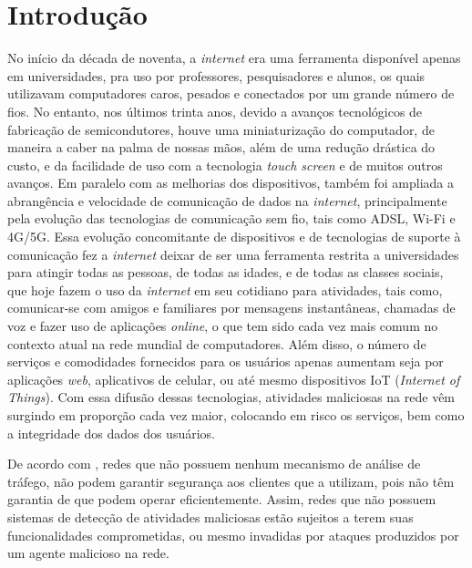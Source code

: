 \chapter[Introdução]{Introdução}
\label{introducao}

No início da década de noventa, a \textit{internet} era uma ferramenta disponível apenas em universidades, pra uso por professores, pesquisadores e alunos, os quais utilizavam computadores caros, pesados e conectados por um grande número de fios. No entanto, nos últimos trinta anos, devido a avanços tecnológicos de fabricação de semicondutores, houve uma miniaturização do computador, de maneira a caber na palma de nossas mãos, além de uma redução drástica do custo, e da facilidade de uso com a tecnologia \textit{touch screen} e de muitos outros avanços. Em paralelo com as melhorias dos dispositivos, também foi ampliada a abrangência e velocidade de comunicação de dados na \textit{internet}, principalmente pela evolução das tecnologias de comunicação sem fio, tais como ADSL, Wi-Fi e 4G/5G. Essa evolução concomitante de dispositivos e de tecnologias de suporte à comunicação fez a \textit{internet} deixar de ser uma ferramenta restrita a universidades para atingir todas as pessoas, de todas as idades, e de todas as classes sociais, que hoje fazem o uso da \textit{internet} em seu cotidiano para atividades, tais como, comunicar-se com amigos e familiares por mensagens instantâneas, chamadas de voz e fazer uso de aplicações \textit{online}, o que tem sido cada vez mais comum no contexto atual na rede mundial de computadores. Além disso, o número de serviços e comodidades fornecidos para os usuários apenas aumentam seja por aplicações \textit{web}, aplicativos de celular, ou até mesmo dispositivos IoT (\textit{Internet of Things}). Com essa difusão dessas tecnologias, atividades maliciosas na rede vêm surgindo em proporção cada vez maior, colocando em risco os serviços, bem como a integridade dos dados dos usuários. 

De acordo com , redes que não possuem nenhum mecanismo de análise de tráfego, não podem garantir segurança aos clientes que a utilizam, pois não têm garantia de que podem operar eficientemente. Assim, redes que não possuem sistemas de detecção de atividades maliciosas estão sujeitos a terem suas funcionalidades comprometidas, ou mesmo invadidas por ataques produzidos por um agente malicioso na rede.

